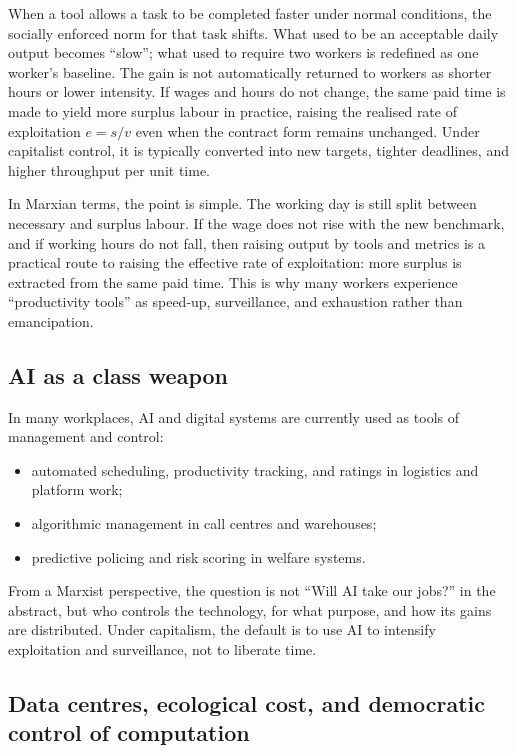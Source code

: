 When a tool allows a task to be completed faster under normal conditions, the socially enforced norm
for that task shifts. What used to be an acceptable daily output becomes “slow”; what used to require
two workers is redefined as one worker’s baseline. The gain is not automatically returned to workers
as shorter hours or lower intensity. If wages and hours do not change, the same paid time is made to yield more surplus labour in practice, raising the realised rate of exploitation \(e=s/v\) even when the contract form remains unchanged. Under capitalist control, it is typically converted into new
targets, tighter deadlines, and higher throughput per unit time.

In Marxian terms, the point is simple. The working day is still split between necessary and surplus labour.
If the wage does not rise with the new benchmark, and if working hours do not fall, then raising output
by tools and metrics is a practical route to raising the effective rate of exploitation: more surplus
is extracted from the same paid time. This is why many workers experience “productivity tools” as speed-up,
surveillance, and exhaustion rather than emancipation.


\subsection{AI as a class weapon}

In many workplaces, AI and digital systems are currently used as tools of
management and control:

\begin{itemize}[leftmargin=1.5em]
  \item automated scheduling, productivity tracking, and ratings in
  logistics and platform work;\cite{WoodEtAl2019}
  \item algorithmic management in call centres and warehouses;
  \item predictive policing and risk scoring in welfare systems.
\end{itemize}

From a Marxist perspective, the question is not ``Will AI take our jobs?'' in
the abstract, but who controls the technology, for what purpose, and how its
gains are distributed. Under capitalism, the default is to use AI to
intensify exploitation and surveillance, not to liberate time.

\subsection{Data centres, ecological cost, and democratic control of computation}
\label{sec:data-centres-ecology-control}

